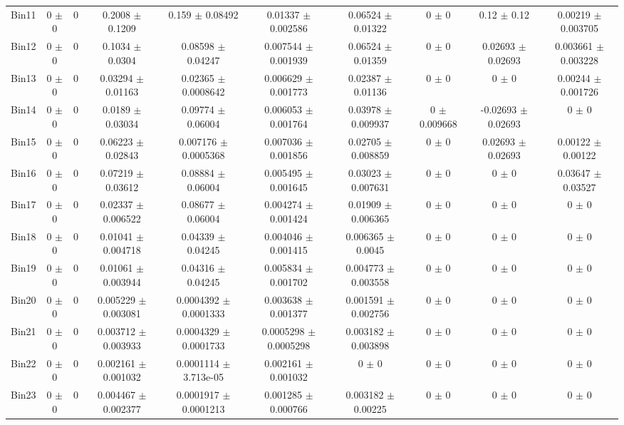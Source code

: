 \begin{tabular}{@{\extracolsep{4pt}}lccccccccc@{}}
     Bin11 & 0 $\pm$ 0 & 0 & 0.2008 $\pm$ 0.1209 & 0.159 $\pm$ 0.08492 & 0.01337 $\pm$ 0.002586 & 0.06524 $\pm$ 0.01322 & 0 $\pm$ 0 & 0.12 $\pm$ 0.12 & 0.00219 $\pm$ 0.003705 \\ 
     Bin12 & 0 $\pm$ 0 & 0 & 0.1034 $\pm$ 0.0304 & 0.08598 $\pm$ 0.04247 & 0.007544 $\pm$ 0.001939 & 0.06524 $\pm$ 0.01359 & 0 $\pm$ 0 & 0.02693 $\pm$ 0.02693 & 0.003661 $\pm$ 0.003228 \\ 
     Bin13 & 0 $\pm$ 0 & 0 & 0.03294 $\pm$ 0.01163 & 0.02365 $\pm$ 0.0008642 & 0.006629 $\pm$ 0.001773 & 0.02387 $\pm$ 0.01136 & 0 $\pm$ 0 & 0 $\pm$ 0 & 0.00244 $\pm$ 0.001726 \\ 
     Bin14 & 0 $\pm$ 0 & 0 & 0.0189 $\pm$ 0.03034 & 0.09774 $\pm$ 0.06004 & 0.006053 $\pm$ 0.001764 & 0.03978 $\pm$ 0.009937 & 0 $\pm$ 0.009668 & -0.02693 $\pm$ 0.02693 & 0 $\pm$ 0 \\ 
     Bin15 & 0 $\pm$ 0 & 0 & 0.06223 $\pm$ 0.02843 & 0.007176 $\pm$ 0.0005368 & 0.007036 $\pm$ 0.001856 & 0.02705 $\pm$ 0.008859 & 0 $\pm$ 0 & 0.02693 $\pm$ 0.02693 & 0.00122 $\pm$ 0.00122 \\ 
     Bin16 & 0 $\pm$ 0 & 0 & 0.07219 $\pm$ 0.03612 & 0.08884 $\pm$ 0.06004 & 0.005495 $\pm$ 0.001645 & 0.03023 $\pm$ 0.007631 & 0 $\pm$ 0 & 0 $\pm$ 0 & 0.03647 $\pm$ 0.03527 \\ 
     Bin17 & 0 $\pm$ 0 & 0 & 0.02337 $\pm$ 0.006522 & 0.08677 $\pm$ 0.06004 & 0.004274 $\pm$ 0.001424 & 0.01909 $\pm$ 0.006365 & 0 $\pm$ 0 & 0 $\pm$ 0 & 0 $\pm$ 0 \\ 
     Bin18 & 0 $\pm$ 0 & 0 & 0.01041 $\pm$ 0.004718 & 0.04339 $\pm$ 0.04245 & 0.004046 $\pm$ 0.001415 & 0.006365 $\pm$ 0.0045 & 0 $\pm$ 0 & 0 $\pm$ 0 & 0 $\pm$ 0 \\ 
     Bin19 & 0 $\pm$ 0 & 0 & 0.01061 $\pm$ 0.003944 & 0.04316 $\pm$ 0.04245 & 0.005834 $\pm$ 0.001702 & 0.004773 $\pm$ 0.003558 & 0 $\pm$ 0 & 0 $\pm$ 0 & 0 $\pm$ 0 \\ 
     Bin20 & 0 $\pm$ 0 & 0 & 0.005229 $\pm$ 0.003081 & 0.0004392 $\pm$ 0.0001333 & 0.003638 $\pm$ 0.001377 & 0.001591 $\pm$ 0.002756 & 0 $\pm$ 0 & 0 $\pm$ 0 & 0 $\pm$ 0 \\ 
     Bin21 & 0 $\pm$ 0 & 0 & 0.003712 $\pm$ 0.003933 & 0.0004329 $\pm$ 0.0001733 & 0.0005298 $\pm$ 0.0005298 & 0.003182 $\pm$ 0.003898 & 0 $\pm$ 0 & 0 $\pm$ 0 & 0 $\pm$ 0 \\ 
     Bin22 & 0 $\pm$ 0 & 0 & 0.002161 $\pm$ 0.001032 & 0.0001114 $\pm$ 3.713e-05 & 0.002161 $\pm$ 0.001032 & 0 $\pm$ 0 & 0 $\pm$ 0 & 0 $\pm$ 0 & 0 $\pm$ 0 \\ 
     Bin23 & 0 $\pm$ 0 & 0 & 0.004467 $\pm$ 0.002377 & 0.0001917 $\pm$ 0.0001213 & 0.001285 $\pm$ 0.000766 & 0.003182 $\pm$ 0.00225 & 0 $\pm$ 0 & 0 $\pm$ 0 & 0 $\pm$ 0 \\ 

\end{tabular}
